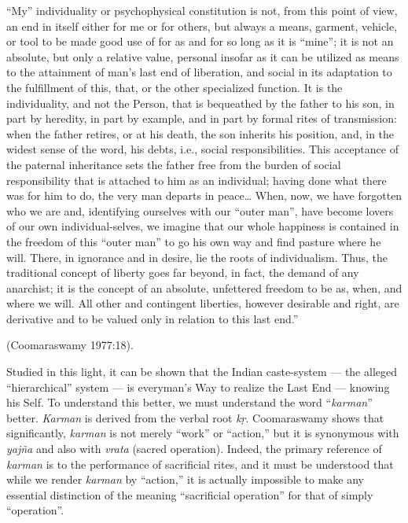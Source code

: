 \begin{myquote}
“My” individuality or psychophysical constitution is not, from this point of view, an end in itself either for me or for others, but always a means, garment, vehicle, or tool to be made good use of for as and for so long as it is “mine”; it is not an absolute, but only a relative value, personal insofar as it can be utilized as means to the attainment of man’s last end of liberation, and social in its adaptation to the fulfillment of this, that, or the other specialized function. It is the individuality, and not the Person, that is bequeathed by the father to his son, in part by heredity, in part by example, and in part by formal rites of transmission: when the father retires, or at his death, the son inherits his position, and, in the widest sense of the word, his debts, i.e., social responsibilities. This acceptance of the paternal inheritance sets the father free from the burden of social responsibility that is attached to him as an individual; having done what there was for him to do, the very man departs in peace… When, now, we have forgotten who we are and, identifying ourselves with our “outer man”, have become lovers of our own individual-selves, we imagine that our whole happiness is contained in the freedom of this “outer man” to go his own way and find pasture where he will. There, in ignorance and in desire, lie the roots of individualism. Thus, the traditional concept of liberty goes far beyond, in fact, the demand of any anarchist; it is the concept of an absolute, unfettered freedom to be as, when, and where we will. All other and contingent liberties, however desirable and right, are derivative and to be valued only in relation to this last end.”

\hfill (Coomaraswamy 1977:18).
\end{myquote}

Studied in this light, it can be shown that the Indian caste-system --- the alleged “hierarchical” system --- is everyman’s Way to realize the Last End --- knowing his Self. To understand this better, we must understand the word “{\sl karman}” better. {\sl Karman} is derived from the verbal root {\sl kṛ}. Coomaraswamy shows that significantly, {\sl karman} is not merely “work” or “action,” but it is synonymous with {\sl yajña} and also with {\sl vrata} (sacred operation). Indeed, the primary reference of {\sl karman} is to the performance of sacrificial rites, and it must be understood that while we render {\sl karman} by “action,” it is actually impossible to make any essential distinction of the meaning “sacrificial operation” for that of simply “operation”.

